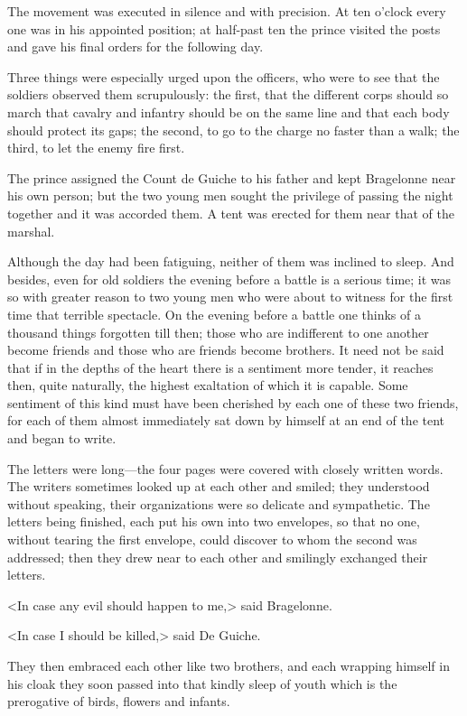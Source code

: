 The movement was executed in silence and with precision. At ten o'clock every one was in his appointed position; at half-past ten the prince visited the posts and gave his final orders for the following day.

Three things were especially urged upon the officers, who were to see that the soldiers observed them scrupulously: the first, that the different corps should so march that cavalry and infantry should be on the same line and that each body should protect its gaps; the second, to go to the charge no faster than a walk; the third, to let the enemy fire first.

The prince assigned the Count de Guiche to his father and kept Bragelonne near his own person; but the two young men sought the privilege of passing the night together and it was accorded them. A tent was erected for them near that of the marshal.

Although the day had been fatiguing, neither of them was inclined to sleep. And besides, even for old soldiers the evening before a battle is a serious time; it was so with greater reason to two young men who were about to witness for the first time that terrible spectacle. On the evening before a battle one thinks of a thousand things forgotten till then; those who are indifferent to one another become friends and those who are friends become brothers. It need not be said that if in the depths of the heart there is a sentiment more tender, it reaches then, quite naturally, the highest exaltation of which it is capable. Some sentiment of this kind must have been cherished by each one of these two friends, for each of them almost immediately sat down by himself at an end of the tent and began to write.

The letters were long—the four pages were covered with closely written words. The writers sometimes looked up at each other and smiled; they understood without speaking, their organizations were so delicate and sympathetic. The letters being finished, each put his own into two envelopes, so that no one, without tearing the first envelope, could discover to whom the second was addressed; then they drew near to each other and smilingly exchanged their letters.

<In case any evil should happen to me,> said Bragelonne.

<In case I should be killed,> said De Guiche.

They then embraced each other like two brothers, and each wrapping himself in his cloak they soon passed into that kindly sleep of youth which is the prerogative of birds, flowers and infants. 
